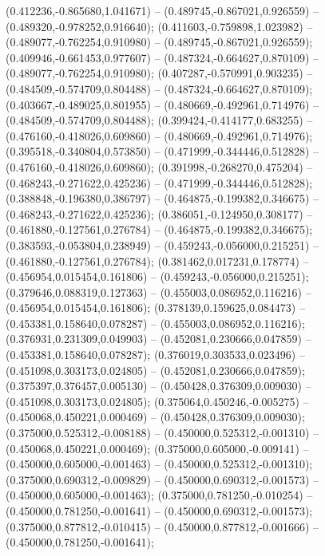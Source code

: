  (0.412236,-0.865680,1.041671) -- (0.489745,-0.867021,0.926559) -- (0.489320,-0.978252,0.916640);
 (0.411603,-0.759898,1.023982) -- (0.489077,-0.762254,0.910980) -- (0.489745,-0.867021,0.926559);
 (0.409946,-0.661453,0.977607) -- (0.487324,-0.664627,0.870109) -- (0.489077,-0.762254,0.910980);
 (0.407287,-0.570991,0.903235) -- (0.484509,-0.574709,0.804488) -- (0.487324,-0.664627,0.870109);
 (0.403667,-0.489025,0.801955) -- (0.480669,-0.492961,0.714976) -- (0.484509,-0.574709,0.804488);
 (0.399424,-0.414177,0.683255) -- (0.476160,-0.418026,0.609860) -- (0.480669,-0.492961,0.714976);
 (0.395518,-0.340804,0.573850) -- (0.471999,-0.344446,0.512828) -- (0.476160,-0.418026,0.609860);
 (0.391998,-0.268270,0.475204) -- (0.468243,-0.271622,0.425236) -- (0.471999,-0.344446,0.512828);
 (0.388848,-0.196380,0.386797) -- (0.464875,-0.199382,0.346675) -- (0.468243,-0.271622,0.425236);
 (0.386051,-0.124950,0.308177) -- (0.461880,-0.127561,0.276784) -- (0.464875,-0.199382,0.346675);
 (0.383593,-0.053804,0.238949) -- (0.459243,-0.056000,0.215251) -- (0.461880,-0.127561,0.276784);
 (0.381462,0.017231,0.178774) -- (0.456954,0.015454,0.161806) -- (0.459243,-0.056000,0.215251);
 (0.379646,0.088319,0.127363) -- (0.455003,0.086952,0.116216) -- (0.456954,0.015454,0.161806);
 (0.378139,0.159625,0.084473) -- (0.453381,0.158640,0.078287) -- (0.455003,0.086952,0.116216);
 (0.376931,0.231309,0.049903) -- (0.452081,0.230666,0.047859) -- (0.453381,0.158640,0.078287);
 (0.376019,0.303533,0.023496) -- (0.451098,0.303173,0.024805) -- (0.452081,0.230666,0.047859);
 (0.375397,0.376457,0.005130) -- (0.450428,0.376309,0.009030) -- (0.451098,0.303173,0.024805);
 (0.375064,0.450246,-0.005275) -- (0.450068,0.450221,0.000469) -- (0.450428,0.376309,0.009030);
 (0.375000,0.525312,-0.008188) -- (0.450000,0.525312,-0.001310) -- (0.450068,0.450221,0.000469);
 (0.375000,0.605000,-0.009141) -- (0.450000,0.605000,-0.001463) -- (0.450000,0.525312,-0.001310);
 (0.375000,0.690312,-0.009829) -- (0.450000,0.690312,-0.001573) -- (0.450000,0.605000,-0.001463);
 (0.375000,0.781250,-0.010254) -- (0.450000,0.781250,-0.001641) -- (0.450000,0.690312,-0.001573);
 (0.375000,0.877812,-0.010415) -- (0.450000,0.877812,-0.001666) -- (0.450000,0.781250,-0.001641);
